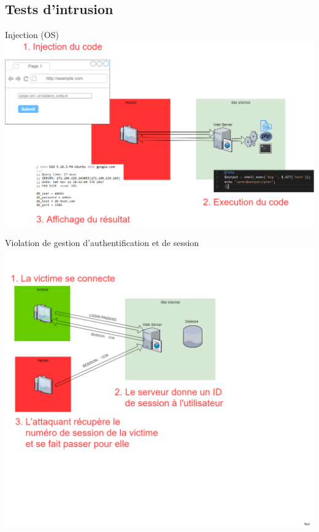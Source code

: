 \documentclass{beamer}
\begin{document}
\subsection{Tests d'intrusion}
\begin{frame}{Injection (OS)}
\centering
\includegraphics[width=\paperwidth]{schemas/images/injection.png}
\end{frame}
\begin{frame}{Violation de gestion d'authentification et de session}
\centering
\includegraphics[width=0.95\paperwidth ]{schemas/images/broken_auth.png}
\end{frame}
\end{document}
